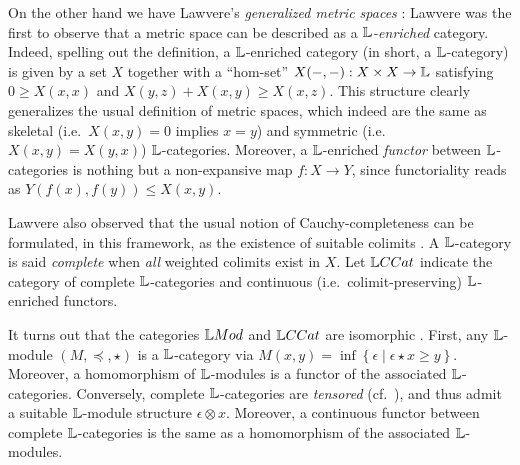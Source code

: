 On the other hand we have Lawvere's \emph{generalized metric spaces}  \cite{Lawvere1973, Hofmann2014, Stubbe2014}:
Lawvere was the first to observe that a metric space can be described as a \emph{$\mathbb{L}$-enriched} category. Indeed, spelling out the definition, a $\mathbb{L}$-enriched category (in short, a $\mathbb{L}$-category) is given by a set $X$ together with a ``hom-set'' $X(-,-):X\times X\to \mathbb{L}$ satisfying 
$0  \geq X(x,x)$ and $X(y,z)+X(x,y)\geq  X(x,z)$. 
This structure clearly generalizes the usual definition of metric spaces, which indeed are the same as skeletal (i.e.~$X(x,y)=0$ implies $x=y$) and symmetric (i.e.~$X(x,y)=X(y,x)$) $\mathbb{L}$-categories.
Moreover, a $\mathbb{L}$-enriched \emph{functor} between $\mathbb{L}$-categories is nothing but a non-expansive map $f:X\to Y$, since functoriality reads as $Y(f(x),f(y))\leq X(x,y)$.

Lawvere also observed that the usual notion of Cauchy-completeness can be formulated, in this framework, as the existence of suitable colimits \cite{Lawvere1973}. A $\mathbb{L}$-category is said \emph{complete} when \emph{all} {weighted colimits} exist in $X$. Let $\GMet$ indicate the category of complete $\mathbb{L}$-categories and continuous (i.e.~colimit-preserving) $\mathbb{L}$-enriched functors. 

It turns out that the categories $\Mod$ and $\GMet$ are isomorphic \cite{Stubbe2006}. First,  any $\mathbb{L}$-module $(M,\preceq, \star)$ is a $\mathbb{L}$-category via
$M(x,y) = \inf\left\{ \epsilon \mid \epsilon \star x\geq y\right\}$. Moreover, a homomorphism of $\mathbb{L}$-modules is a functor of the associated $\mathbb{L}$-categories. Conversely, complete $\mathbb{L}$-categories are \emph{tensored} (cf.~\cite{Stubbe2014}), and thus admit a suitable $\mathbb{L}$-module structure $\epsilon \otimes x$.
Moreover, a continuous functor between complete $\mathbb{L}$-categories is the same as a homomorphism of the associated $\mathbb{L}$-modules. 
%
%
%
%
%

